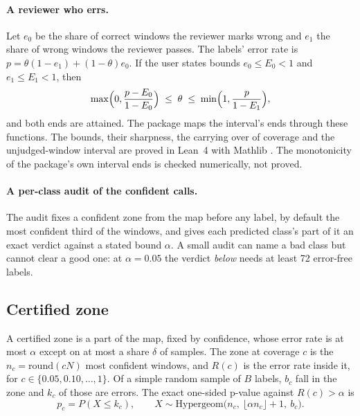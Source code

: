\documentclass[11pt,a4paper]{article}
\begin{document}
\paragraph{A reviewer who errs.} Let $e_0$ be the share of correct windows the reviewer marks wrong and $e_1$ the
share of wrong windows the reviewer passes. The labels' error rate is $p = \theta(1 - e_1) + (1 - \theta) e_0$. If
the user states bounds $e_0 \le E_0 < 1$ and $e_1 \le E_1 < 1$, then
\begin{equation}
  \max\Bigl(0, \frac{p - E_0}{1 - E_0}\Bigr) \;\le\; \theta \;\le\; \min\Bigl(1, \frac{p}{1 - E_1}\Bigr),
\end{equation}
and both ends are attained. The package maps the interval's ends through these functions. The bounds, their
sharpness, the carrying over of coverage and the unjudged-window interval are proved in Lean~4 \citep{demoura2021}
with Mathlib \citep{mathlib2020}. The monotonicity of the package's own interval ends is checked numerically, not
proved.

\paragraph{A per-class audit of the confident calls.}
\label{sec:audit}
The audit fixes a confident zone from the map before any label, by default the most confident third of the windows,
and gives each predicted class's part of it an exact verdict against a stated bound $\alpha$. A small audit can name
a bad class but cannot clear a good one: at $\alpha = 0.05$ the verdict \textit{below} needs at least 72 error-free
labels.

\subsection{Certified zone}
\label{sec:zone}

A certified zone is a part of the map, fixed by confidence, whose error rate is at most $\alpha$ except on at most a
share $\delta$ of samples. The zone at coverage $c$ is the $n_c = \mathrm{round}(cN)$ most confident windows, and
$R(c)$ is the error rate inside it, for $c \in \{0.05, 0.10, \dots, 1\}$. Of a simple random sample of $B$ labels,
$b_c$ fall in the zone and $k_c$ of those are errors. The exact one-sided p-value against $R(c) > \alpha$ is
\begin{equation}
  p_c = P(X \le k_c), \qquad X \sim \mathrm{Hypergeom}\bigl(n_c,\ \lfloor \alpha n_c \rfloor + 1,\ b_c\bigr).
\end{equation}
\end{document}
